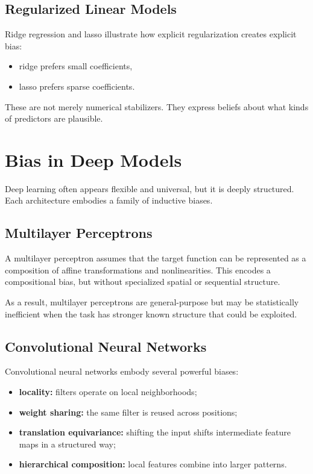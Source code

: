 \subsection{Regularized Linear Models}

Ridge regression and lasso illustrate how explicit regularization creates explicit bias:
\begin{itemize}
    \item ridge prefers small coefficients,
    \item lasso prefers sparse coefficients.
\end{itemize}
These are not merely numerical stabilizers. They express beliefs about what kinds of predictors are plausible.

\section{Bias in Deep Models}

Deep learning often appears flexible and universal, but it is deeply structured. Each architecture embodies a family of inductive biases.

\subsection{Multilayer Perceptrons}

A multilayer perceptron assumes that the target function can be represented as a composition of affine transformations and nonlinearities. This encodes a compositional bias, but without specialized spatial or sequential structure.

As a result, multilayer perceptrons are general-purpose but may be statistically inefficient when the task has stronger known structure that could be exploited.

\subsection{Convolutional Neural Networks}

Convolutional neural networks embody several powerful biases:
\begin{itemize}
    \item \textbf{locality:} filters operate on local neighborhoods;
    \item \textbf{weight sharing:} the same filter is reused across positions;
    \item \textbf{translation equivariance:} shifting the input shifts intermediate feature maps in a structured way;
    \item \textbf{hierarchical composition:} local features combine into larger patterns.
\end{itemize}

